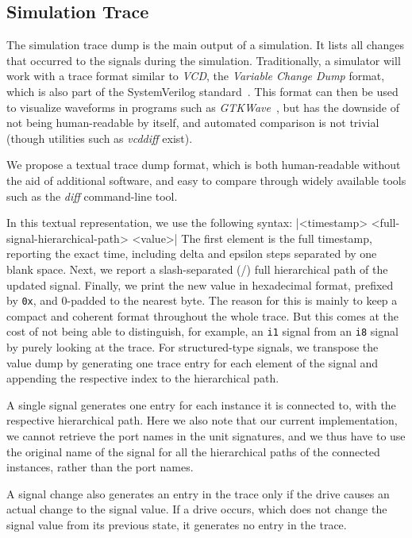
\subsection{Simulation Trace}
\label{sec:trace}
The simulation trace dump is the main output of a simulation. It lists all changes that occurred to the signals during the simulation. Traditionally, a simulator will work with a trace format similar to \textit{VCD}, the \textit{Variable Change Dump} format, which is also part of the SystemVerilog standard~\cite{SV2018}. This format can then be used to visualize waveforms in programs such as \textit{GTKWave}~\cite{gtkwave}, but has the downside of not being human-readable by itself, and automated comparison is not trivial (though utilities such as \textit{vcddiff} \cite{vcddiff} exist).

We propose a textual trace dump format, which is both human-readable without the aid of additional software, and easy to compare through widely available tools such as the \textit{diff} command-line tool.

In this textual representation, we use the following syntax:
|<timestamp>  <full-signal-hierarchical-path>  <value>|
\noindent The first element is the full timestamp, reporting the exact time, including delta and epsilon steps separated by one blank space. Next, we report a slash-separated (/) full hierarchical path of the updated signal. Finally, we print the new value in hexadecimal format, prefixed by \texttt{0x}, and $0$-padded to the nearest byte. The reason for this is mainly to keep a compact and coherent format throughout the whole trace. But this comes at the cost of not being able to distinguish, for example, an \texttt{i1} signal from an \texttt{i8} signal by purely looking at the trace.
For structured-type signals, we transpose the value dump by generating one trace entry for each element of the signal and appending the respective index to the hierarchical path.

A single signal generates one entry for each instance it is connected to, with the respective hierarchical path. Here we also note that our current implementation, we cannot retrieve the port names in the unit signatures, and we thus have to use the original name of the signal for all the hierarchical paths of the connected instances, rather than the port names.

A signal change also generates an entry in the trace only if the drive causes an actual change to the signal value. If a drive occurs, which does not change the signal value from its previous state, it generates no entry in the trace.

